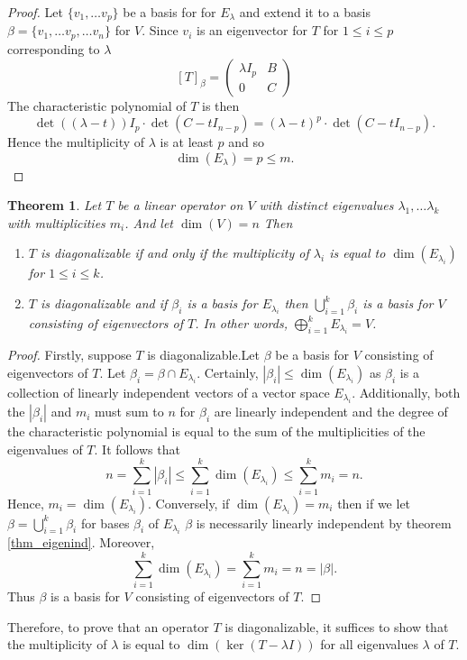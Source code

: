 \documentclass[oneside, 12pt]{book}
\newtheorem{thm}{Theorem}[section]
\theoremstyle{definition}
\begin{document}
\begin{proof}
  Let $\{v_{1}, \dots v_{p}\}$ be a basis for for $E_{\lambda}$ and extend it to a basis $\beta=\{v_{1}, \dots v_{p}, \dots v_{n}\}$ for $V$. Since $v_{i}$ is an eigenvector for $T$ for $1 \leq i \leq p$ corresponding to $\lambda$ \[[T]_{\beta}=
    \begin{pmatrix}
      \lambda I_{p} & B \\
      0 & C
                                                                                                                                     \end{pmatrix}\]
                                                                                                                                   The characteristic polynomial of $T$ is then \[\det((\lambda -t))I_{p} \cdot \det(C-tI_{n-p})=(\lambda-t)^{p}\cdot \det(C-tI_{n-p}).\] Hence the multiplicity of $\lambda$ is at least $p$ and so
                                                                                                                                   \[\dim(E_{\lambda})=p\leq m.\]
\end{proof}
\begin{thm}
  \label{thm_diageigen}
  Let $T$ be a linear operator on $V$ with distinct eigenvalues $\lambda_{1}, \dots \lambda_{k}$ with multiplicities $m_{i}$. And let $\dim(V)=n$ Then
  \begin{enumerate}
    \item $T$ is diagonalizable if and only if the multiplicity of $\lambda_{i}$ is equal to $\dim(E_{\lambda_{i}})$ for $1 \leq i \leq k$.
          \item $T$ is diagonalizable and if $\beta_{i}$ is a basis for $E_{\lambda_{i}}$ then $\bigcup_{i=1}^{k}\beta_{i}$ is a basis for $V$ consisting of eigenvectors of $T$. In other words, $\bigoplus_{i=1}^{k}E_{\lambda_{i}}=V$.
  \end{enumerate}
\end{thm}
\begin{proof}
Firstly, suppose $T$ is diagonalizable.Let $\beta$ be a basis for $V$ consisting of eigenvectors of $T$. Let $\beta_{i}=\beta\cap E_{\lambda_{i}}$. Certainly, $|\beta_{i}| \leq \dim(E_{\lambda_{i}})$ as $\beta_{i}$ is a collection of linearly independent vectors of a vector space $E_{\lambda_{i}}$. Additionally, both the $|\beta_{i}|$ and $m_{i}$ must sum to $n$ for $\beta_{i}$ are linearly independent and the degree of the characteristic polynomial is equal to the sum of the multiplicities of the eigenvalues of $T$.
It follows that \[n=\sum_{i=1}^{k}|\beta_{i}|\leq \sum_{i=1}^{k}\dim(E_{\lambda_{i}}) \leq \sum_{i=1}^{k}m_{i}=n.\] Hence, $m_{i}=\dim(E_{\lambda_{i}})$.
Conversely, if $\dim(E_{\lambda_{i}})=m_{i}$ then if we let $\beta= \bigcup_{i=1}^{k}\beta_{i} $ for bases $\beta_{i}$ of $E_{\lambda_{i}}$ $\beta$ is necessarily linearly independent by theorem \ref{thm_eigenind}. Moreover,
\[\sum_{i=1}^{k}\dim(E_{\lambda_{i}})=\sum_{i=1}^{k}m_{i}=n=|\beta|.\] Thus $\beta$ is a basis for $V$ consisting of eigenvectors of $T$.
\end{proof}
Therefore, to prove that an operator $T$ is diagonalizable, it suffices to show that the multiplicity of $\lambda$ is equal to $\dim(\ker(T-\lambda I))$ for all eigenvalues $\lambda$ of $T$.
\end{document}
